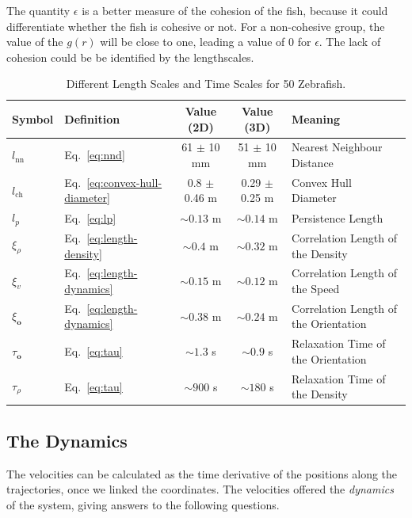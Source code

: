 \documentclass[11pt,twoside]{report}
\begin{document}
\noindent The quantity $\epsilon$ is a better measure of the cohesion of the fish, because it could differentiate whether the fish is cohesive or not. For a non-cohesive group, the value of the $g(r)$ will be close to one, leading a value of 0 for $\epsilon$. The lack of cohesion could be be identified by the lengthscales.


\begin{table}
\begin{adjustwidth*}{0in}{-1.5in}
	\centering
	\begin{tabular}{ l l c c l }
		\toprule
		Symbol & Definition & Value (2D) & Value (3D) & Meaning\\
		\midrule
		$l_\mathrm{nn}$ &
		Eq.~\ref{eq:nnd} &
		61 $\pm$ 10 mm &
		51 $\pm$ 10 mm &
		Nearest Neighbour Distance
		\\
		$l_\mathrm{ch}$ &
		Eq.~\ref{eq:convex-hull-diameter} &
		0.8 $\pm$ 0.46 m &
		0.29 $\pm$ 0.25 m &
		Convex Hull Diameter\\
		$l_p$ &
		Eq.~\ref{eq:lp} &
		$\sim 0.13$ m &
		$\sim 0.14$ m &
		Persistence Length\\
		$\xi_\rho$ &
		Eq.~\ref{eq:length-density} &
		$\sim 0.4$ m &
		$\sim 0.32$ m &
		Correlation Length of the Density\\
		$\xi_v$ &
		Eq.~\ref{eq:length-dynamics} &
		$\sim 0.15$ m &
		$\sim 0.12$ m &
		Correlation Length of the Speed\\
		$\xi_\mathbf{o}$ &
		Eq.~\ref{eq:length-dynamics} &
		$\sim 0.38$ m &
		$\sim 0.24$ m &
		Correlation Length of the Orientation\\
		$\tau_\mathbf{o}$ &
		Eq.~\ref{eq:tau} &
		$\sim 1.3$ s &
		$\sim 0.9$ s &
		Relaxation Time of the Orientation\\
		$\tau_\rho$ &
		Eq.~\ref{eq:tau} &
		$\sim 900$ s &
		$\sim 180$ s &
		Relaxation Time of the Density\\
	\bottomrule
	\end{tabular}
\caption{
Different Length Scales and Time Scales for 50 Zebrafish.}
\label{table:behaviour}
\end{adjustwidth*}
\end{table}

\subsection{The Dynamics}

The velocities can be calculated as the time derivative of the positions along the trajectories, once we linked the coordinates. The velocities offered the \emph{dynamics} of the system, giving answers to the following questions.
\end{document}
